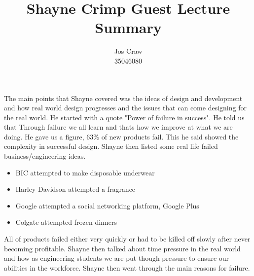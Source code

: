 \documentclass{article}
\title{Shayne Crimp Guest Lecture Summary}
\author{Jos Craw\\35046080}
\begin{document}
\maketitle{}

The main points that Shayne covered was the ideas of design and development and how real world
design progresses and the issues that can come designing for the real world. He started with a quote
"Power of failure in success". He told us that Through failure we all learn and thats how we improve
at what we are doing. He gave us a figure, 63\% of new products fail. This he said showed the
complexity in successful design. Shayne then listed some real life failed business/engineering
ideas.

\begin{itemize}
    \item{BIC attempted to make disposable underwear}
    \item{Harley Davidson attempted a fragrance}
    \item{Google attempted a social networking platform, Google Plus}
    \item{Colgate attempted frozen dinners}
\end{itemize}

All of products failed either very quickly or had to be killed off slowly after never becoming
profitable. Shayne then talked about time pressure in the real world and how as engineering students
we are put though pressure to ensure our abilities in the workforce. Shayne then went through the
main reasons for failure.
\end{document}
